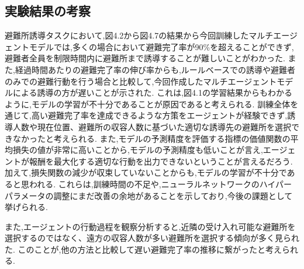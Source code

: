 \subsection{実験結果の考察}
避難所誘導タスクにおいて,図4.2から図4.7の結果から今回訓練したマルチエージェントモデルでは,多くの場合において避難完了率が90\%を超えることができず,避難者全員を制限時間内に避難所まで誘導することが難しいことがわかった.
また,経過時間あたりの避難完了率の伸び率からも,ルールベースでの誘導や避難者のみでの避難行動を行う場合と比較して,今回作成したマルチエージェントモデルによる誘導の方が遅いことが示された.
これは,図4.1の学習結果からもわかるように,モデルの学習が不十分であることが原因であると考えられる.
訓練全体を通じて,高い避難完了率を達成できるような方策をエージェントが経験できず,誘導人数や現在位置、避難所の収容人数に基づいた適切な誘導先の避難所を選択できなかったと考えられる.
また,モデルの予測精度を評価する指標の価値関数の平均損失の値が非常に高いことから,モデルの予測精度も低いことが言え,エージェントが報酬を最大化する適切な行動を出力できないということが言えるだろう.加えて,損失関数の減少が収束していないことからも,モデルの学習が不十分であると思われる.
これらは,訓練時間の不足や,ニューラルネットワークのハイパーパラメータの調整にまだ改善の余地があることを示しており,今後の課題として挙げられる.

また,エージェントの行動過程を観察分析すると,近隣の受け入れ可能な避難所を選択するのではなく、遠方の収容人数が多い避難所を選択する傾向が多く見られた.
このことが,他の方法と比較して遅い避難完了率の推移に繋がったと考えられる.

